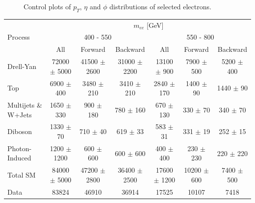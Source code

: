 	\begin{figure}[h]
	    \begin{center}
	    \end{center}
	   \caption{Control plots of $p_{T}$, $\eta$ and $\phi$ distributions of selected electrons.}
	   \label{fig:control_main}
	\end{figure}


	\begin {table}[h]
		\footnotesize 
		\begin{center}
		\begin{tabular}{  l | c c c | c c c  } 
			\hline
			\multirow{3}{*}{Process} 	& \multicolumn{6}{c}{$m_{ee}$ [GeV]} \\
										& \multicolumn{3}{c}{400 - 550} & \multicolumn{3}{c}{550 - 800} \\
										\cline{2-7}
										& All & Forward & Backward & All & Forward & Backward \\
			\hline
			Drell-Yan & 72000 $\pm$ 5000 & 41500 $\pm$ 2600 & 31000 $\pm$ 2200 & 13100 $\pm$ 900 & 7900 $\pm$ 500 & 5200 $\pm$ 400 \\
			Top & 6900 $\pm$ 400 & 3480 $\pm$ 210 & 3410 $\pm$ 210 & 2840 $\pm$ 170 & 1400 $\pm$ 90 & 1440 $\pm$ 90 \\
			Multijets \& W+Jets & 1650 $\pm$ 330 & 900 $\pm$ 180 & 780 $\pm$ 160 & 670 $\pm$ 130 & 330 $\pm$ 70 & 340 $\pm$ 70 \\
			Diboson & 1330 $\pm$ 70 & 710 $\pm$ 40 & 619 $\pm$ 33 & 583 $\pm$ 31 & 331 $\pm$ 19 & 252 $\pm$ 15 \\
			Photon-Induced & 1200 $\pm$ 1200 & 600 $\pm$ 600 & 600 $\pm$ 600 & 400 $\pm$ 400 & 230 $\pm$ 230 & 220 $\pm$ 220 \\
			\hline
			Total SM & 84000 $\pm$ 5000 & 47200 $\pm$ 2800 & 36400 $\pm$ 2500 & 17600 $\pm$ 1200 & 10200 $\pm$ 600 & 7400 $\pm$ 500 \\
			\hline
			Data & 83824 & 46910 & 36914 & 17525 & 10107 & 7418 \\
			\hline


\end{tabular}
\end{center}
\end{table}
